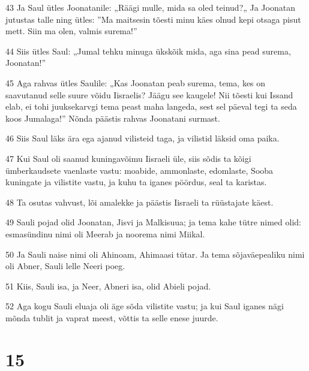 \par 43 Ja Saul ütles Joonatanile: „Räägi mulle, mida sa oled teinud?„ Ja Joonatan jutustas talle ning ütles: ”Ma maitsesin tõesti minu käes olnud kepi otsaga pisut mett. Siin ma olen, valmis surema!”
\par 44 Siis ütles Saul: „Jumal tehku minuga ükskõik mida, aga sina pead surema, Joonatan!”
\par 45 Aga rahvas ütles Saulile: „Kas Joonatan peab surema, tema, kes on saavutanud selle suure võidu Iisraelis? Jäägu see kaugele! Nii tõesti kui Issand elab, ei tohi juuksekarvgi tema peast maha langeda, sest sel päeval tegi ta seda koos Jumalaga!” Nõnda päästis rahvas Joonatani surmast.
\par 46 Siis Saul läks ära ega ajanud vilisteid taga, ja vilistid läksid oma paika.
\par 47 Kui Saul oli saanud kuningavõimu Iisraeli üle, siis sõdis ta kõigi ümberkaudsete vaenlaste vastu: moabide, ammonlaste, edomlaste, Sooba kuningate ja vilistite vastu, ja kuhu ta iganes pöördus, seal ta karistas.
\par 48 Ta osutas vahvust, lõi amalekke ja päästis Iisraeli ta rüüstajate käest.
\par 49 Sauli pojad olid Joonatan, Jisvi ja Malkisuua; ja tema kahe tütre nimed olid: esmasündinu nimi oli Meerab ja noorema nimi Miikal.
\par 50 Ja Sauli naise nimi oli Ahinoam, Ahimaasi tütar. Ja tema sõjaväepealiku nimi oli Abner, Sauli lelle Neeri poeg.
\par 51 Kiis, Sauli isa, ja Neer, Abneri isa, olid Abieli pojad.
\par 52 Aga kogu Sauli eluaja oli äge sõda vilistite vastu; ja kui Saul iganes nägi mõnda tublit ja vaprat meest, võttis ta selle enese juurde.

\chapter{15}

